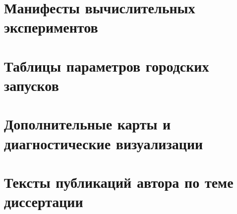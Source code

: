 \renewcommand{\chaptername}{Приложение}
\renewcommand{\appendixname}{Приложение}

\chapter{Манифесты вычислительных экспериментов}
\label{app:manifests}

\chapter{Таблицы параметров городских запусков}
\label{app:city-run-parameters}

\chapter{Дополнительные карты и диагностические визуализации}
\label{app:diagnostic-maps}

\chapter{Тексты публикаций автора по теме диссертации}
\label{app:publications}

